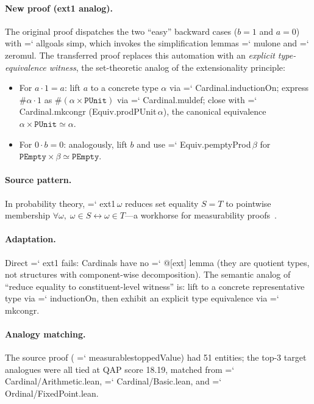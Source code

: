 \documentclass[11pt]{article}
\renewcommand{\texttt}[1]{%
  \begingroup\ttfamily\hyphenchar\font=`\-\relax
  \def\_{\textunderscore\discretionary{}{}{}}%
  #1\endgroup}
\theoremstyle{definition}
\theoremstyle{remark}
\begin{document}
\paragraph{New proof (ext1 analog).}
The original proof dispatches the two ``easy'' backward cases
($b = 1$ and $a = 0$) with \texttt{all\_goals simp}, which invokes
the simplification lemmas \texttt{mul\_one} and \texttt{zero\_mul}.
The transferred proof replaces this automation with an
\emph{explicit type-equivalence witness}, the set-theoretic analog
of the extensionality principle:

\begin{itemize}
\item For $a \cdot 1 = a$: lift $a$ to a concrete type $\alpha$ via
  \texttt{Cardinal.inductionOn}; express $\#\alpha \cdot 1$ as
  $\#(\alpha \times \mathtt{PUnit})$ via \texttt{Cardinal.mul\_def};
  close with \texttt{Cardinal.mk\_congr (Equiv.prodPUnit\,$\alpha$)},
  the canonical equivalence $\alpha \times \mathtt{PUnit} \simeq \alpha$.

\item For $0 \cdot b = 0$: analogously, lift $b$ and use
  \texttt{Equiv.pemptyProd\,$\beta$} for
  $\mathtt{PEmpty} \times \beta \simeq \mathtt{PEmpty}$.
\end{itemize}

\paragraph{Source pattern.}  In probability theory, \texttt{ext1\,$\omega$}
reduces set equality $S = T$ to pointwise membership
$\forall \omega,\; \omega \in S \leftrightarrow \omega \in T$---a
workhorse for measurability proofs~\cite{yanasse_part1}.

\paragraph{Adaptation.}  Direct \texttt{ext1} fails: Cardinals have no
\texttt{@[ext]} lemma (they are quotient types, not structures with
component-wise decomposition).  The semantic analog of ``reduce
equality to constituent-level witness'' is: lift to a concrete
representative type via \texttt{inductionOn}, then exhibit an
explicit type equivalence via \texttt{mk\_congr}.

\paragraph{Analogy matching.}  The source proof
(\texttt{measurable\_stoppedValue}) had 51 entities; the top-3
target analogues were all tied at QAP score 18.19, matched from
\texttt{Cardinal/Arithmetic.lean}, \texttt{Cardinal/Basic.lean}, and
\texttt{Ordinal/FixedPoint.lean}.
\end{document}
